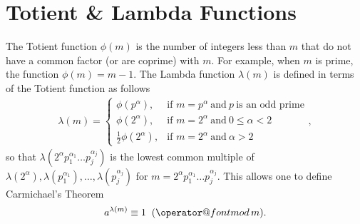 \documentclass[twocolumn]{IEEEtran}
\makeatletter
\def\imod#1{\allowbreak\mkern10mu({\operator@font mod}\,#1)}
\newcommand{\primeSymbol}{p}
\newcommand{\modulusSymbol}{m}
\makeatother
\begin{document}
\section{Totient \& Lambda Functions}\label{sec::Totient}
The Totient function $\phi(\modulusSymbol)$ is the number of integers less than $\modulusSymbol$ that do not have a common factor (or are coprime) with $\modulusSymbol$. For example, when $\modulusSymbol$ is prime, the function $\phi(\modulusSymbol) = \modulusSymbol-1$. The Lambda function $\lambda(\modulusSymbol)$ is defined in terms of the Totient function as follows
\begin{eqnarray}\label{eqn::LambdaDef}
\lambda(\modulusSymbol) =
 \begin{cases}
 \phi(\primeSymbol^{\alpha}), & \mbox{if } \modulusSymbol=\primeSymbol^{\alpha}\ \text{and}\ \primeSymbol\ \text{is an odd prime}\\ 
 \phi(2^{\alpha}), & \mbox{if } \modulusSymbol=2^{\alpha}\ \text{and}\ 0 \leqslant\alpha < 2\\
 \frac{1}{2}\phi(2^{\alpha}), & \mbox{if } \modulusSymbol=2^{\alpha}\ \text{and}\ \alpha > 2
 \end{cases}, \nonumber
\end{eqnarray}
so that $\lambda(2^{\alpha}\primeSymbol^{\alpha_1}_1\ldots \primeSymbol^{\alpha_j}_j)$ is the lowest common multiple of $\lambda(2^{\alpha}), \lambda(\primeSymbol^{\alpha_1}_1),\ldots, \lambda(\primeSymbol^{\alpha_j}_j)$ for $\modulusSymbol = 2^{\alpha}\primeSymbol^{\alpha_1}_1\ldots \primeSymbol^{\alpha_j}_j$. This allows one to define Carmichael's Theorem~\citep{Carmichael1910}
\begin{equation}\label{eqn::Carmichael}
 a^{\lambda(\modulusSymbol)} \equiv 1 \imod \modulusSymbol.
\end{equation}

\small



\end{document}
